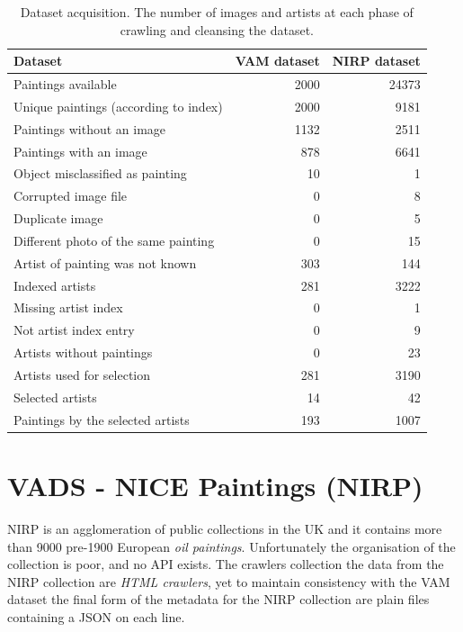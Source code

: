\documentclass[11pt,a4paper,twoside,openright]{report}
\begin{document}
\begin{table}[ptb]
\centering
\begin{tabular}{|l|rr|}
\toprule
Dataset & VAM dataset & NIRP dataset \\
\midrule
Paintings available                   & 2000 & 24373 \\
Unique paintings (according to index) & 2000 &  9181 \\
Paintings without an image            & 1132 &  2511 \\
Paintings with an image               &  878 &  6641 \\
Object misclassified as painting      &   10 &     1 \\
Corrupted image file                  &    0 &     8 \\
Duplicate image                       &    0 &     5 \\
Different photo of the same painting  &    0 &    15 \\
Artist of painting was not known      &  303 &   144 \\
\midrule
Indexed artists                       &  281 &  3222 \\
Missing artist index                  &    0 &     1 \\
Not artist index entry                &    0 &     9 \\
Artists without paintings             &    0 &    23 \\
Artists used for selection            &  281 &  3190 \\
Selected artists                      &   14 &    42 \\
\midrule
Paintings by the selected artists     &  193 &  1007 \\
\bottomrule
\end{tabular}
\caption[Dataset acquisition]{Dataset acquisition.  The number of images and
artists at each phase of crawling and cleansing the dataset.}
\label{tab:crawl}
\end{table}

\section{VADS - NICE Paintings (NIRP)}

NIRP is an agglomeration of public collections in the UK and it contains more
than 9000 pre-1900 European \emph{oil paintings}.  Unfortunately the
organisation of the collection is poor, and no API exists.  The crawlers
collection the data from the NIRP collection are \emph{HTML crawlers}, yet to
maintain consistency with the VAM dataset the final form of the metadata for
the NIRP collection are plain files containing a JSON on each line.
\end{document}
